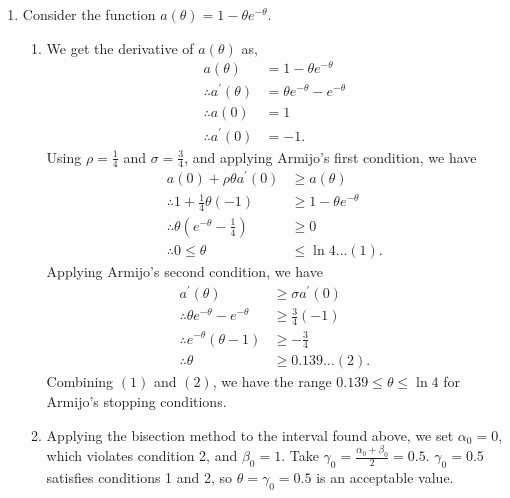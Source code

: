 \documentclass[a4paper,11pt]{article}
\newcommand{\ds}{\displaystyle}
\begin{document}
{{\begin{enumerate}[leftmargin=*]
		\item Consider the function $\ds{a(\theta) = 1 - \theta e^{-\theta}}$.
			\begin{enumerate}[label=\alph*)]
				\item We get the derivative of $\ds{a(\theta)}$ as,
					\begin{align*}
						a(\theta) & = 1 - \theta e^{-\theta} \\
						\therefore a^{\prime}(\theta) & = \theta e^{-\theta} - e^{-\theta} \\
						\therefore a(0) & = 1 \\
						\therefore a^{\prime}(0) & = -1.
					\end{align*}
					Using $\ds{\rho = \frac{1}{4}}$ and $\ds{\sigma = \frac{3}{4}}$, and applying Armijo's first condition, we have
					\begin{align*}
						a(0) + \rho\theta a^{\prime}(0) & \geq a(\theta) \\
						\therefore 1 + \frac{1}{4}\theta(-1) & \geq 1 - \theta e^{-\theta} \\
						\therefore \theta\left(e^{-\theta} - \frac{1}{4}\right) & \geq 0 \\
						\therefore 0 \leq \theta & \leq \ln{4} \dots (1).
					\end{align*}
					Applying Armijo's second condition, we have
					\begin{align*}
						a^{\prime}(\theta) & \geq  \sigma a^{\prime}(0) \\
						\therefore \theta e^{-\theta} - e^{-\theta} & \geq \frac{3}{4}(-1) \\
						\therefore e^{-\theta}(\theta - 1) & \geq -\frac{3}{4} \\
						\therefore \theta & \geq 0.139 \dots (2).
					\end{align*}
					Combining $\ds{(1)}$ and $\ds{(2)}$, we have the range $\ds{0.139 \leq \theta \leq \ln{4}}$ for Armijo's stopping conditions.
				\item Applying the bisection method to the interval found above, we set $\ds{\alpha_0 = 0}$, which violates condition 2, and $\ds{\beta_0 = 1}$. Take $\ds{\gamma_0 = \frac{\alpha_0 + \beta_0}{2} = 0.5}$. $\ds{\gamma_0 = 0.5}$ satisfies conditions 1 and 2, so $\ds{\theta = \gamma_0 = 0.5}$ is an acceptable value.



\end{enumerate}
\end{enumerate}}}
\end{document}
